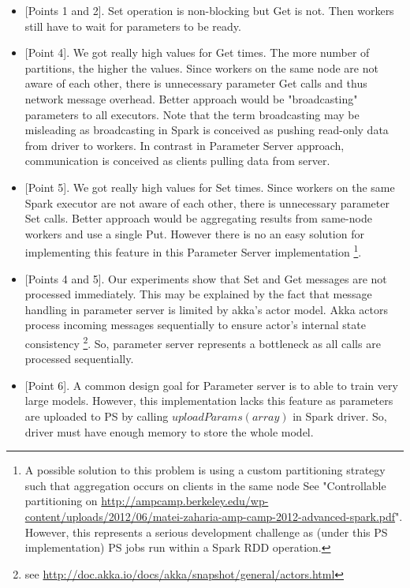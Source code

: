 \begin{itemize}
  \item {[}Points 1 and 2{]}. Set operation is non-blocking but Get is not. Then workers still have to wait for parameters to be ready.
  \item {[}Point 4{]}. We got really high values for Get times. The more number of partitions, the higher the values. Since workers on the same node are not aware of each other, there is unnecessary parameter Get calls and thus network message overhead. Better approach would be "broadcasting" parameters to all executors. Note that the term broadcasting may be misleading as broadcasting in Spark is conceived as pushing read-only data from driver to workers. In contrast in Parameter Server approach, communication is conceived as clients pulling data from server.
  \item {[}Point 5{]}. We got really high values for Set times. Since workers on the same Spark executor are not aware of each other, there is unnecessary parameter Set calls. Better approach would be aggregating results from same-node workers and use a single Put. However there is no an easy solution for implementing this feature in this Parameter Server implementation \footnote{A possible solution to this problem is using a custom partitioning strategy such that aggregation occurs on clients in the same node See "Controllable partitioning on \url{http://ampcamp.berkeley.edu/wp-content/uploads/2012/06/matei-zaharia-amp-camp-2012-advanced-spark.pdf}". However, this represents a serious development challenge as (under this PS implementation) PS jobs run within a Spark RDD operation.}.
  \item {[}Points 4 and 5{]}. Our experiments show that Set and Get messages are not processed immediately. This may be explained by the fact that message handling in parameter server is limited by akka's actor model. Akka actors process incoming messages sequentially to ensure actor's internal state consistency \footnote{see \url{http://doc.akka.io/docs/akka/snapshot/general/actors.html}}. So, parameter server represents a bottleneck as all calls are processed sequentially.
  \item {[}Point 6{]}. A common design goal for Parameter server is to able to train very large models. However, this implementation lacks this feature as parameters are uploaded to PS by calling $uploadParams(array)$ in Spark driver. So, driver must have enough memory to store the whole model.
\end{itemize}


